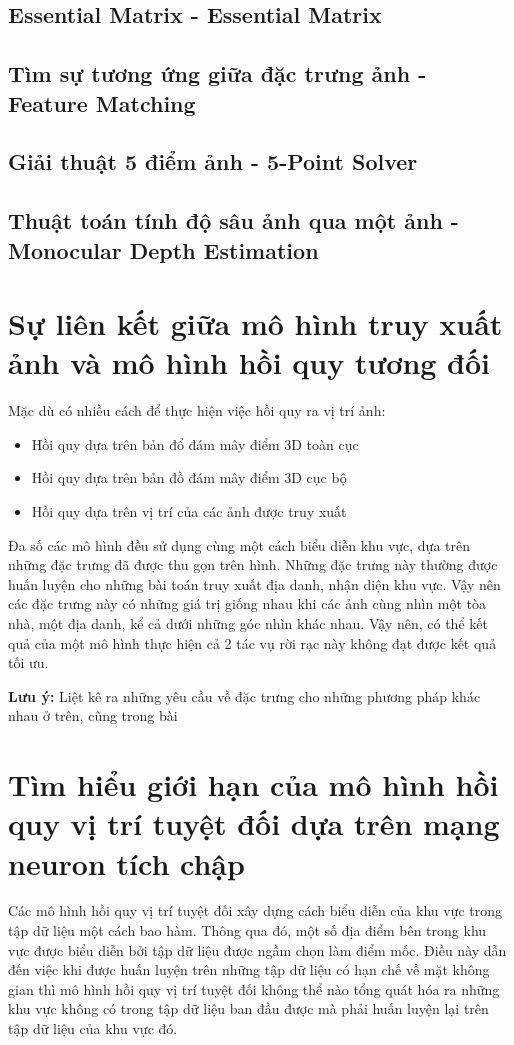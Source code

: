 \subsection{Essential Matrix - Essential Matrix}
\subsection{Tìm sự tương ứng giữa đặc trưng ảnh - Feature Matching}
\subsection{Giải thuật 5 điểm ảnh - 5-Point Solver}
\subsection{Thuật toán tính độ sâu ảnh qua một ảnh - Monocular Depth Estimation}
\section{Sự liên kết giữa mô hình truy xuất ảnh và mô hình hồi quy tương đối}
Mặc dù có nhiều cách để thực hiện việc hồi quy ra vị trí ảnh:
\begin{itemize}
    \item Hồi quy dựa trên bản đổ đám mây điểm 3D toàn cục
    \item Hồi quy dựa trên bản đồ đám mây điểm 3D cục bộ
    \item Hồi quy dựa trên vị trí của các ảnh được truy xuất
\end{itemize}
Đa số các mô hình đều sử dụng cùng một cách biểu diễn khu vực, dựa trên những đặc trưng đã được thu gọn trên hình. Những đặc trưng này thường được huấn luyện cho những bài toán truy xuất địa danh, nhận diện khu vực. Vậy nên các đặc trưng này có những giá trị giống nhau khi các ảnh cùng nhìn một tòa nhà, một địa danh, kể cả dưới những góc nhìn khác nhau. Vậy nên, có thể kết quả của một mô hình thực hiện cả 2 tác vụ rời rạc này không đạt được kết quả tối ưu.\cite{pion2020benchmarking}

\textbf{Lưu ý:} Liệt kê ra những yêu cầu về đặc trưng cho những phương pháp khác nhau ở trên, cũng trong bài \cite{pion2020benchmarking}
\section{Tìm hiểu giới hạn của mô hình hồi quy vị trí tuyệt đối dựa trên mạng neuron tích chập}
Các mô hình hồi quy vị trí tuyệt đối xây dựng cách biểu diễn của khu vực trong tập dữ liệu một cách bao hàm. Thông qua đó, một số địa điểm bên trong khu vực được biểu diễn bởi tập dữ liệu được ngầm chọn làm điểm mốc. Điều này dẫn đến việc khi được huấn luyện trên những tập dữ liệu có hạn chế về mặt không gian thì mô hình hồi quy vị trí tuyệt đối không thể nào tổng quát hóa ra những khu vực không có trong tập dữ liệu ban đầu được mà phải huấn luyện lại trên tập dữ liệu của khu vực đó.\cite{sattler2019understanding}

